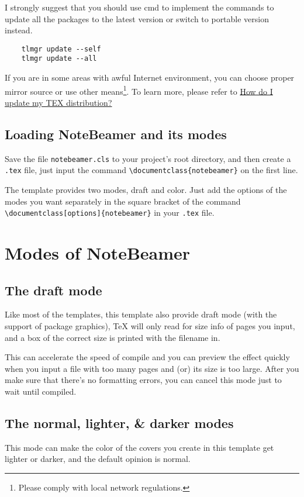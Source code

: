 \documentclass[11pt]{article}
\makeatletter
\def\@pkg#1{\texorpdfstring{\href{https://www.ctan.org/pkg/#1}%
{\textcolor{pkgcolor}{\textsf{#1}}}}{“#1”}}
\def\s@pkg#1{\texorpdfstring{\textcolor{pkgcolor}{\textsf{#1}}}{“#1”}}
\DeclareRobustCommand\pkg{\@ifstar\s@pkg\@pkg}
\def\mode#1{\texorpdfstring{\textcolor{moducolor}{\textsf{#1}}}{“#1”}}
\makeatother
\begin{document}
I strongly suggest that you should use cmd to implement the commands to update all the packages to the latest version or switch to portable version instead.
\begin{verbatim}
    tlmgr update --self
    tlmgr update --all
\end{verbatim}

If you are in some areas with awful Internet environment, you can choose proper mirror source or use other means\footnote{Please comply with local network regulations.}. To learn more, please refer to \href{https://tex.stackexchange.com/questions/55437/how-do-i-update-my-tex-distribution}{How do I update my TEX distribution?}

\subsection{Loading \pkg{NoteBeamer} and its modes}
Save the file \verb|notebeamer.cls| to your project's root directory, and then create a \verb|.tex| file, just input the command \verb|\documentclass{notebeamer}| on the first line.

The template provides two modes, \mode{draft} and \mode{color}. Just add the options of the modes you want separately in the square bracket of the command \verb|\documentclass[options]{notebeamer}| in your \verb|.tex| file.

\section{Modes of \pkg{NoteBeamer}}


\subsection{The \mode{draft} mode}
Like most of the templates, this template also provide \mode{draft} mode (with the support of package \pkg{graphics}), \sffamily\TeX{} will only read for size info of pages you input, and a box of the correct size is printed with the filename in.

This can accelerate the speed of compile and you can preview the effect quickly when you input a file with too many pages and (or) its size is too large. After you make sure that there's no formatting errors, you can cancel this mode just to wait until compiled.

\subsection{The \mode{normal}, \mode{lighter}, \& \mode{darker} modes}
This mode can make the color of the covers you create in this template get lighter or darker, and the default opinion is \mode{normal}.
\end{document}
